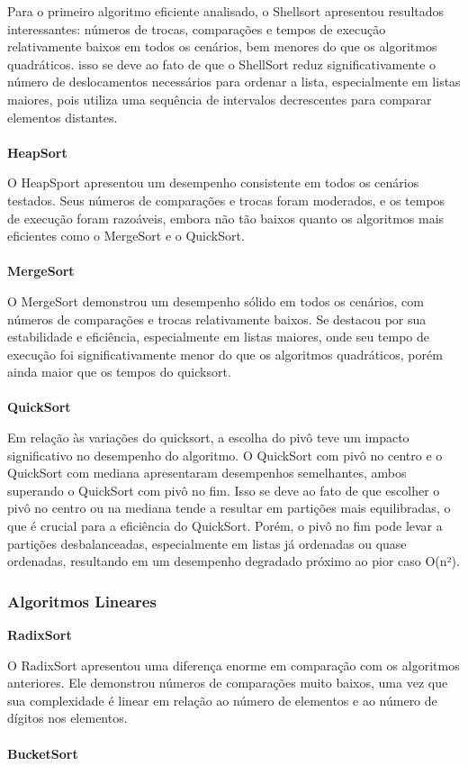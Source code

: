 \documentclass[a4paper, 12pt]{article} %
\begin{document}
Para o primeiro algoritmo eficiente analisado, o Shellsort apresentou resultados interessantes: números de trocas, comparações e tempos de execução relativamente 
baixos em todos os cenários, bem menores do que os algoritmos quadráticos.
isso se deve ao fato de que o ShellSort reduz significativamente o número de deslocamentos necessários para ordenar a lista, 
especialmente em listas maiores, pois utiliza uma sequência de intervalos decrescentes para comparar elementos distantes.
\\ \\
\textbf{HeapSort}

O HeapSport apresentou um desempenho consistente em todos os cenários testados. Seus números de comparações e trocas foram moderados, 
e os tempos de execução foram razoáveis, embora não tão baixos quanto os algoritmos mais eficientes como o MergeSort e o QuickSort.
\\ \\
\textbf{MergeSort}

O MergeSort demonstrou um desempenho sólido em todos os cenários, com números de comparações e trocas relativamente baixos.
Se destacou por sua estabilidade e eficiência, especialmente em listas maiores, onde seu tempo de execução foi significativamente menor do que os 
algoritmos quadráticos, porém ainda maior que os tempos do quicksort.
\\ \\
\textbf{QuickSort}

Em relação às variações do quicksort, a escolha do pivô teve um impacto significativo no desempenho do algoritmo.
O QuickSort com pivô no centro e o QuickSort com mediana apresentaram desempenhos semelhantes, ambos superando o QuickSort com pivô no fim.
Isso se deve ao fato de que escolher o pivô no centro ou na mediana tende a resultar em partições mais equilibradas, o que é crucial para a eficiência do QuickSort.
Porém, o pivô no fim pode levar a partições desbalanceadas, especialmente em listas já ordenadas ou quase ordenadas, resultando em um desempenho degradado próximo ao pior caso O(n²).

\subsubsection{Algoritmos Lineares}
\textbf{RadixSort}

O RadixSort apresentou uma diferença enorme em comparação com os algoritmos anteriores. Ele demonstrou números de comparações muito baixos, 
uma vez que sua complexidade é linear em relação ao número de elementos e ao número de dígitos nos elementos.
\\ \\
\textbf{BucketSort}
\end{document}
